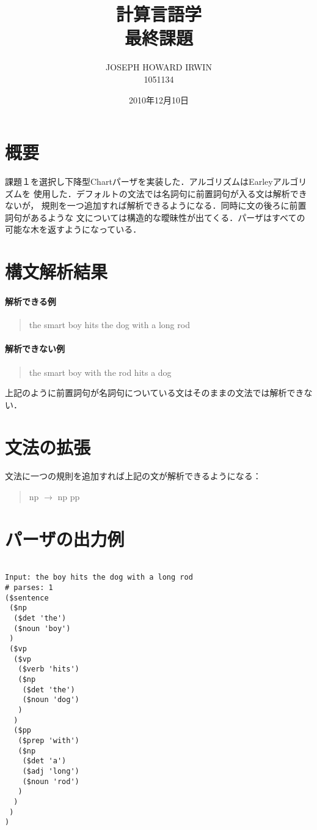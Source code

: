 \documentclass[11pt,a4paper]{jsarticle}
\title{計算言語学\\最終課題}
\author{JOSEPH HOWARD IRWIN\\1051134}
\date{2010年12月10日}
\begin{document}
\maketitle


\section*{概要}

課題１を選択し下降型Chartパーザを実装した．アルゴリズムはEarleyアルゴリズムを
使用した．デフォルトの文法では名詞句に前置詞句が入る文は解析できないが，
規則を一つ追加すれば解析できるようになる．同時に文の後ろに前置詞句があるような
文については構造的な曖昧性が出てくる．パーザはすべての可能な木を返すようになっている．

\section*{構文解析結果}

\paragraph{解析できる例}
\begin{quote}
the smart boy hits the dog with a long rod
\end{quote}

\paragraph{解析できない例}
\begin{quote}
the smart boy with the rod hits a dog
\end{quote}
上記のように前置詞句が名詞句についている文はそのままの文法では解析できない．


\section*{文法の拡張}
文法に一つの規則を追加すれば上記の文が解析できるようになる：
\begin{quote}
np $\rightarrow$ np pp
\end{quote}


\section*{パーザの出力例}
\begin{verbatim}

Input: the boy hits the dog with a long rod
# parses: 1
($sentence
 ($np
  ($det 'the')
  ($noun 'boy')
 )
 ($vp
  ($vp
   ($verb 'hits')
   ($np
    ($det 'the')
    ($noun 'dog')
   )
  )
  ($pp
   ($prep 'with')
   ($np
    ($det 'a')
    ($adj 'long')
    ($noun 'rod')
   )
  )
 )
)

\end{verbatim}
\end{document}
